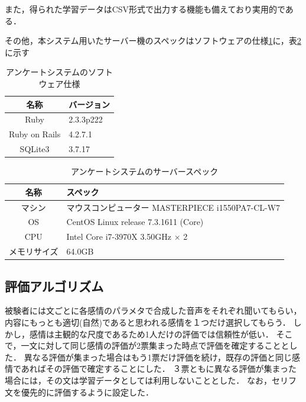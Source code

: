 また，得られた学習データはCSV形式で出力する機能も備えており実用的である．

その他，本システム用いたサーバー機のスペックはソフトウェアの仕様\ref{software}に，表\ref{server}に示す

\begin{table}[ht]
  \begin{center}
  \caption{アンケートシステムのソフトウェア仕様}
  \label{software}
  \begin{tabular}{|c|l|}
    \hline
    名称 & バージョン \\ \hline \hline
    Ruby & 2.3.3p222 \\ \hline
    Ruby on Rails & 4.2.7.1 \\ \hline
    SQLite3 & 3.7.17 \\ \hline
  \end{tabular}
  \end{center}
\end{table}

\begin{table}[ht]
  \begin{center}
  \caption{アンケートシステムのサーバースペック}
  \label{server}
  \begin{tabular}{|c|l|}
    \hline
     名称 & スペック \\ \hline \hline
    マシン &  マウスコンピューター MASTERPIECE i1550PA7-CL-W7\\ \hline
    OS &  CentOS Linux release 7.3.1611 (Core)\\ \hline
    CPU & Intel Core i7-3970X 3.50GHz × 2\\ \hline
    メモリサイズ & 64.0GB \\ \hline
  \end{tabular}
  \end{center}
\end{table}



\subsection{評価アルゴリズム}
被験者には文ごとに各感情のパラメタで合成した音声をそれぞれ聞いてもらい，内容にもっとも適切(自然)であると思われる感情を１つだけ選択してもらう．
しかし，感情は主観的な尺度であるため1人だけの評価では信頼性が低い．
そこで，一文に対して同じ感情の評価が2票集まった時点で評価を確定することとした．
異なる評価が集まった場合はもう1票だけ評価を続け，既存の評価と同じ感情であればその評価で確定することにした．
３票ともに異なる評価が集まった場合には，その文は学習データとしては利用しないこととした．
なお，セリフ文を優先的に評価するように設定した．


